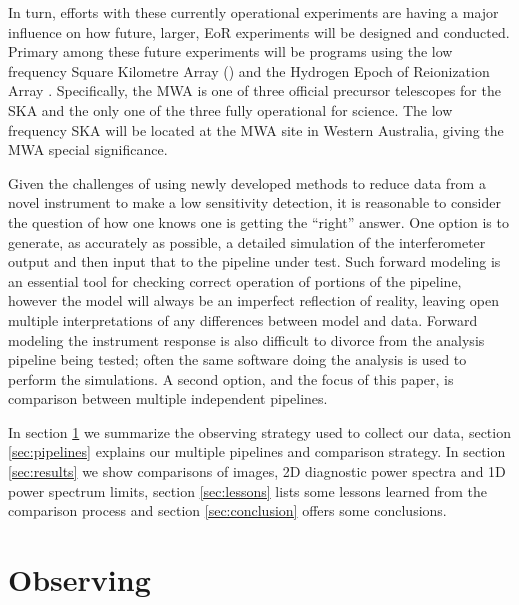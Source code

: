 \documentclass[twolcolumn,iop]{emulateapj}
\begin{document}
In turn, efforts with these currently operational experiments are having a major influence on how future, larger, EoR experiments will be designed and conducted.  Primary among these future experiments will be programs using the low frequency Square Kilometre Array (\cite{2014aska.confE...1K}) and the Hydrogen Epoch of Reionization Array \citep[HERA][]{Pober:2014p10390}.  Specifically, the MWA is one of three official precursor telescopes for the SKA and the only one of the three fully operational for science.  The low frequency SKA will be located at the MWA site in Western Australia, giving the MWA special significance.

Given the challenges of using newly developed methods to reduce data from a novel instrument to make a low sensitivity detection, it is reasonable to consider the question of how one knows one is getting the ``right'' answer.  One option is to generate, as accurately as possible, a detailed simulation of the interferometer output and then input that to the pipeline under test.  Such forward modeling is an essential tool for checking correct operation of portions of the pipeline, however the model will always be an imperfect reflection of reality, leaving open multiple interpretations of any differences between model and data.  Forward modeling the instrument response is also difficult to divorce from the analysis pipeline being tested; often the same software doing the analysis is used to perform the simulations. A second option, and the focus of this paper, is comparison between multiple independent pipelines.






In section \ref{sec:observing} we summarize the observing strategy used to collect our data, section \ref{sec:pipelines} explains our multiple pipelines and comparison strategy. In section \ref{sec:results} we show comparisons of images, 2D diagnostic power spectra and 1D power spectrum limits, section \ref{sec:lessons} lists some lessons learned from the comparison process and section \ref{sec:conclusion} offers some conclusions.



\section{Observing}
\label{sec:observing}
\end{document}

